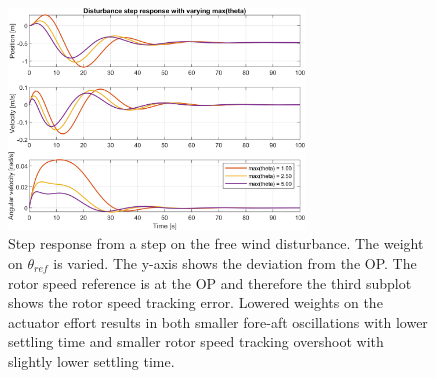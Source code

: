 \begin{figure}[ht]
	\centering
	\includegraphics[width=0.7\textwidth]{Graphics/LQI pole zero/105_step_theta.png}
	\caption{Step response from a step on the free wind disturbance. The weight on $ \theta_{ref} $ is varied. The y-axis shows the deviation from the OP. The rotor speed reference is at the OP and therefore the third subplot shows the rotor speed tracking error. Lowered weights on the actuator effort results in both smaller fore-aft oscillations with lower settling time and smaller rotor speed tracking overshoot with slightly lower settling time.}
	\label{fig:step_theta}
\end{figure}


%	
%	
